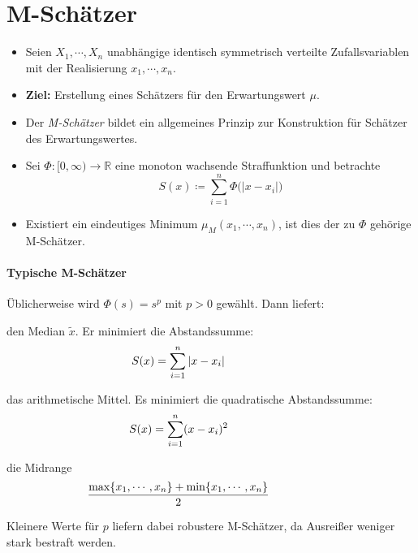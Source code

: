\documentclass[a4paper, 11pt, accentcolor = tud3b]{tudreport}
\newcommand{\abs}[1]{\ensuremath{{\lvert #1 \rvert}}}
\newcommand{\R}{\ensuremath{\mathbb{R}}}
\begin{document}
        \section{M-Schätzer}
	        \begin{itemize}
	        	\item Seien \( X_1, \cdots, X_n \) unabhängige identisch symmetrisch verteilte Zufallsvariablen mit der Realisierung \(x_1, \cdots, x_n\).
	        	\item \textbf{Ziel:} Erstellung eines Schätzers für den Erwartungswert \(\mu\).
		        \item Der \textit{M-Schätzer} bildet ein allgemeines Prinzip zur Konstruktion für Schätzer des Erwartungswertes.
		        \item Sei \( \Phi : [0, \infty) \rightarrow \R \) eine monoton wachsende Straffunktion und betrachte
			        \begin{equation*}
				        S(x) \coloneqq \sum_{i = 1}^{n} \Phi\big( \abs{x - x_i} \big)
			        \end{equation*}
			    \item Existiert ein eindeutiges Minimum \( \mu_M(x_1, \cdots, x_n) \), ist dies der zu \(\Phi\) gehörige M-Schätzer.
	        \end{itemize}
        
	        \paragraph{Typische M-Schätzer}
		        Üblicherweise wird \( \Phi(s) = s^p \) mit \( p > 0 \) gewählt. Dann liefert:
		        \begin{description}[leftmargin = 2cm]
		        	\item[\( p = 1\)] den Median \( \tilde{x} \). Er minimiert die Abstandssumme:
			        	\begin{equation*}
				        	\hspace{-2cm} S(x) = \sum_{i = 1}^{n} \abs{x - x_i}
			        	\end{equation*}
			        \item[\( p = 2 \)] das arithmetische Mittel. Es minimiert die quadratische Abstandssumme:
				        \begin{equation*}
					        \hspace{-2cm} S(x) = \sum_{i = 1}^{n} (x - x_i)^2
				        \end{equation*}
				    \item[\( p \rightarrow \infty \)] die Midrange
					    \begin{equation*}
						    \hspace{-2cm} \frac{\max \{ x_1, \cdots, x_n \} + \min \{ x_1, \cdots, x_n \}}{2}
					    \end{equation*}
		        \end{description}
		        Kleinere Werte für \(p\) liefern dabei robustere M-Schätzer, da Ausreißer weniger stark bestraft werden.
		        
\end{document}
